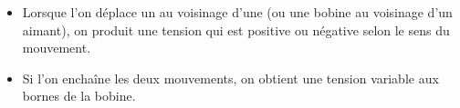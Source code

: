 \begin{mybilan}
	\begin{itemize}
		\item Lorsque l'on déplace un  au voisinage d'une  (ou une bobine au voisinage d'un aimant), on produit une tension qui est positive ou négative selon le sens du mouvement.
		\item Si l'on enchaîne les deux mouvements, on obtient une tension variable aux bornes de la bobine.
	\end{itemize}
\end{mybilan}